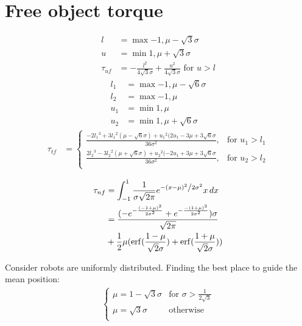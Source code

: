 \section{Free object torque}
\begin{align}
l &= \max{-1,\mu -\sqrt{3} \sigma}\\
u &= \min{1,\mu+\sqrt{3}\sigma}\\
\tau_{uf} &= -\frac{l^2}{4\sqrt{3}\sigma}+ \frac{u^2}{4\sqrt{3}\sigma} \textrm{  for    }  u>l
\end{align}
\begin{align}
l_1 &= \max{-1,\mu-\sqrt{6}\sigma}\\ \nonumber
l_2 &= \max{-1,\mu}\\ \nonumber
u_1 &= \min{1,\mu}\\ \nonumber
u_2 &= \min{1,\mu+\sqrt{6}\sigma} \nonumber
\end{align}
\begin{align}
\tau_{tf} &=  \left\{
\begin{array}{ll}
\frac{-2{l_1}^3+3{l_1}^2(\mu-\sqrt{6}\sigma)+{u_1}^2(2u_1 - 3\mu+3\sqrt{6}\sigma}{36\sigma^2}, &   \textrm{for     } u_1 > l_1\\
\frac{2{l_2}^3-3{l_2}^2(\mu+\sqrt{6}\sigma)+{u_2}^2(-2u_1 + 3\mu+3\sqrt{6}\sigma}{36\sigma^2}, &   \textrm{for     } u_2 > l_2\\
\end{array} 
\right.
\end{align}


\begin{align} \nonumber
\tau_{nf} &= \int_{-1}^1\frac{1}{{\sigma \sqrt {2\pi } }}e^{{{ - \left( {x - \mu } \right)^2 } \mathord{\left/ {\vphantom {{ - \left( {x - \mu } \right)^2 } {2\sigma ^2 }}} \right. \kern-\nulldelimiterspace} {2\sigma ^2 }}} x \, dx\\
 &= \frac{(-e^{-\frac{(-1+\mu)^2}{2\sigma^2}}+e^{-\frac{-(1+\mu)^2}{2\sigma^2}})\sigma}{\sqrt{2\pi}}\\
 &+ \frac{1}{2}\mu(\erf(\frac{1-\mu}{\sqrt{2}\sigma})+\erf(\frac{1+\mu}{\sqrt{2}\sigma})) 
\end{align}


Consider robots are uniformly distributed. Finding the best place to guide the mean position:
\begin{align}
\left\{
\begin{array}{ll}
\mu = 1-\sqrt{3}\sigma &   \textrm{for     } \sigma > \frac{1}{2\sqrt{3}}\\
\mu = \sqrt{3}\sigma &   \textrm{otherwise}\\
\end{array} 
\right.
\end{align}

